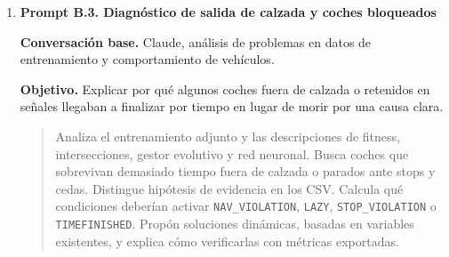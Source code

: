 {\begin{enumerate}[leftmargin=*,itemsep=0.2\baselineskip,topsep=2pt,parsep=0pt,partopsep=0pt]
  \textbf{Objetivo.} Evitar que el entrenamiento premie coches que sobreviven sin avanzar, retroceden o permanecen inmóviles sin una causa de tráfico válida.

  \promptDepurado
  \begin{quote}
  \small
  Revisa la lógica de fitness y detección de muerte para vehículos que retroceden o se quedan parados. Necesito diferenciar una parada legítima, por semáforo, stop, ceda u obstáculo delante, de una parada que solo alarga la vida del coche sin aportar recorrido útil. Propón una lógica basada en velocidad real, contexto de tráfico, sensores frontales y tiempo de vida. No uses números fijos sin justificación. Indica qué razón de muerte o métrica de diagnóstico debe registrarse para validar el cambio.
  \end{quote}

  \textbf{Respuesta aprovechada.} Se aprovechó la separación conceptual entre parada justificada y comportamiento perezoso, además de la necesidad de penalizar el retroceso con una causa trazable.

  \textbf{Comprobación realizada.} Se comprobó con los informes de entrenamiento, las razones de muerte \texttt{LAZY}, \texttt{BACKWARDS} y \texttt{TIMEFINISHED}, y los casos de coches vivos sin progreso.

  \textbf{Uso final en el proyecto.} El capítulo 6 describe la penalización por marcha atrás, estancamiento y navegación no válida, y el capítulo 7 advierte que el tiempo de vida no puede usarse como único indicador.

  \item \textbf{Prompt B.3. Diagnóstico de salida de calzada y coches bloqueados}

  \textbf{Conversación base.} Claude, análisis de problemas en datos de entrenamiento y comportamiento de vehículos.

  \textbf{Objetivo.} Explicar por qué algunos coches fuera de calzada o retenidos en señales llegaban a finalizar por tiempo en lugar de morir por una causa clara.

  \promptDepurado
  \begin{quote}
  \small
  Analiza el entrenamiento adjunto y las descripciones de fitness, intersecciones, gestor evolutivo y red neuronal. Busca coches que sobrevivan demasiado tiempo fuera de calzada o parados ante stops y cedas. Distingue hipótesis de evidencia en los CSV. Calcula qué condiciones deberían activar \texttt{NAV\_VIOLATION}, \texttt{LAZY}, \texttt{STOP\_VIOLATION} o \texttt{TIMEFINISHED}. Propón soluciones dinámicas, basadas en variables existentes, y explica cómo verificarlas con métricas exportadas.
  \end{quote}


\end{enumerate}}
